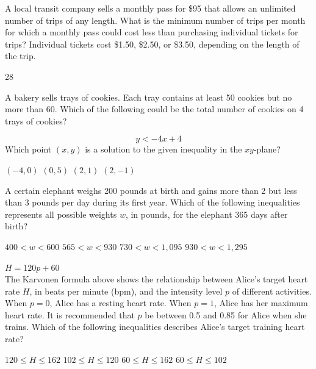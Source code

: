 \newpage



\question[1]
A local transit company sells a monthly pass for \$95 that allows an unlimited number of trips of any length.
What is the minimum number of trips per month for which a monthly pass could cost less than purchasing individual tickets for trips?
Individual tickets cost \$1.50, \$2.50, or \$3.50, depending on the length of the trip.
\begin{solution}
28
\end{solution}

\question[1]
A bakery sells trays of cookies. Each tray contains at least 50 cookies but no more than 60. Which of the following could be the total number of cookies on 4 trays of cookies?
\begin{choices}
\end{choices}

\question[1]
  \[y<-4x+4\]
Which point $(x,y)$ is a solution to the given inequality in the $xy$-plane?
\begin{choices}
  \CorrectChoice $(-4,0)$
  \choice $(0,5)$
  \choice $(2,1)$
  \choice $(2,-1)$
\end{choices}




\newpage




\question[1]
A certain elephant weighs 200 pounds at birth and gains more than 2 but less than 3 pounds per day during its first year. Which of the following inequalities represents all possible weights $w$, in pounds, for the elephant 365 days after birth?
\begin{choices}
  \choice $400<w<600$
  \choice $565<w<930$
  \choice $730<w<1,095$
  \CorrectChoice $930<w<1,295$
\end{choices}

\question[1]
  $H=120p+60$\\
The Karvonen formula above shows the relationship between Alice's target heart rate $H$, in beats per minute (bpm), and the intensity level $p$ of different activities. When $p=0$, Alice has a resting heart rate. When $p=1$, Alice has her maximum heart rate. It is recommended that $p$ be between 0.5 and 0.85 for Alice when she trains. Which of the following inequalities describes Alice's target training heart rate?
\begin{choices}
  \CorrectChoice $120 \leq H \leq 162$
  \choice $102 \leq H \leq 120$
  \choice $60 \leq H \leq 162$
  \choice $60 \leq H \leq 102$
\end{choices}





